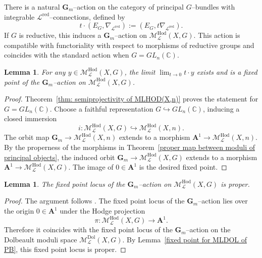 \documentclass[12pt,reqno]{amsart}
\numberwithin{equation}{subsection}
\newtheorem{lem}[equation]{Lemma}
\theoremstyle{definition}
\theoremstyle{theorem}
\begin{document}
There is a natural $\mathbf{G}_{m}$--action on the category of principal
$G$--bundles with integrable $\mathcal{L}^{\mathrm{red}}$--connections,
defined by
\[
t\cdot (E_{G},\nabla_{\mathcal{L}^{\mathrm{red}}})
:=(E_{G},t\nabla_{\mathcal{L}^{\mathrm{red}}}).
\]
If $G$ is reductive, this induces a $\mathbf{G}_{m}$--action on
$\mathcal{M}^{\mathrm{Hod}}_{\mathcal{L}}(X,G)$.
This action is compatible with functoriality with respect to morphisms of
reductive groups and coincides with the standard action when
$G=GL_{n}(\mathbb{C})$.

\begin{lem}\label{limit exist for MLHOD of PB}
	For any $y\in \mathcal{M}^{\mathrm{Hod}}_{\mathcal{L}}(X,G)$,
	the limit $
	\lim_{t\to 0} t\cdot y$
	exists and is a fixed point of the $\mathbf{G}_{m}$--action on
	$\mathcal{M}^{\mathrm{Hod}}_{\mathcal{L}}(X,G)$.
\end{lem}

\begin{proof}
	Theorem~\eqref{thm: semiprojectivity of MLHOD(X,n)} proves the statement
	for $G=GL_{n}(\mathbb{C})$.
	Choose a faithful representation
	$G\hookrightarrow GL_{n}(\mathbb{C})$, inducing a closed immersion
	\[
	i:\mathcal{M}^{\mathrm{Hod}}_{\mathcal{L}}(X,G)
	\hookrightarrow
	\mathcal{M}^{\mathrm{Hod}}_{\mathcal{L}}(X,n).
	\]
	The orbit map
	$\mathbf{G}_{m}\to \mathcal{M}^{\mathrm{Hod}}_{\mathcal{L}}(X,n)$
	extends to a morphism
	$\mathbf{A}^{1}\to \mathcal{M}^{\mathrm{Hod}}_{\mathcal{L}}(X,n)$.
	By the properness of the morphisms in
	Theorem~\ref{proper map between moduli of principal objects},
	the induced orbit
	$\mathbf{G}_{m}\to \mathcal{M}^{\mathrm{Hod}}_{\mathcal{L}}(X,G)$
	extends to a morphism
	$\mathbf{A}^{1}\to \mathcal{M}^{\mathrm{Hod}}_{\mathcal{L}}(X,G)$.
	The image of $0\in \mathbf{A}^{1}$ is the desired fixed point.
\end{proof}

 
\begin{lem}\label{fixed point for MLHOD of PB}
	The fixed point locus of the $\mathbf{G}_{m}$--action on
	$\mathcal{M}^{\mathrm{Hod}}_{\mathcal{L}}(X,G)$
	is proper.
\end{lem}

\begin{proof}
	The argument follows \cite[\S\,10, Lemma~10.4]{CT.Simpson-1997}.
	The fixed point locus of the $\mathbf{G}_{m}$--action lies over the origin
	$0\in \mathbf{A}^{1}$ under the Hodge projection
	\[
	\pi:\mathcal{M}^{\mathrm{Hod}}_{\mathcal{L}}(X,G)\to \mathbf{A}^{1}.
	\]
	Therefore it coincides with the fixed point locus of the
	$\mathbf{G}_{m}$--action on the Dolbeault moduli space
	$\mathcal{M}^{\mathrm{Dol}}_{\mathcal{L}}(X,G)$.
	By Lemma~\eqref{fixed point for MLDOL of PB}, this fixed point locus is
	proper.
\end{proof}
\end{document}
